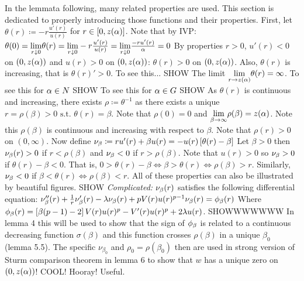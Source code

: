 \begin{outlines}
  \1 In the lemmata following, many related properties are used. This section is dedicated to properly introducing those functions and their properties.
  \1 First, let $\theta(r)\coloneqq-r\frac{u'(r)}{u(r)}$ for $r\in[0,z(\alpha)]$.
    \2 Note that by IVP: $\theta(0)=\underset{r\downarrow0}{\lim}\theta(r)=\underset{r\downarrow0}{\lim}-r\frac{u'(r)}{u(r)}=\underset{r\downarrow0}{\lim}\frac{-ru'(r)}{\alpha}=0$
    \2 By properties $r>0$, $u'(r)<0$ on $(0,z(\alpha))$ and $u(r)>0$ on $(0,z(\alpha))$: $\theta(r)>0$ on $(0,z(\alpha))$.
    \2 Also, $\theta(r)$ is increasing, that is $\theta(r)'>0$.
      \3 To see this... SHOW
    \2 The limit $\underset{r\to z(\alpha)}{\lim}\theta(r)=\infty$.
      \3 To see this for $\alpha\in N$ SHOW
      \3 To see this for $\alpha\in G$ SHOW
  \1 As $\theta(r)$ is continuous and increasing, there exists $\rho\coloneqq\theta^{-1}$ as there exists a unique $r=\rho(\beta)>0\text{ s.t. } \theta(r)=\beta$.
    \2 Note that $\rho(0)=0$ and $\underset{\beta\to\infty}{\lim}\rho(\beta)=z(\alpha)$.
    \2 Note this $\rho(\beta)$ is continuous and increasing with respect to $\beta$.
    \2 Note that $\rho(r)>0$ on $(0,\infty)$.
  \1 Now define $\nu_{\beta}\coloneqq ru'(r)+\beta u(r)=-u(r)\left[\theta(r)-\beta\right]$
  \1 Let $\beta>0$ then $\nu_{\beta}(r)>0$ if $r<\rho(\beta)$ and $\nu_{\beta}<0$ if $r>\rho(\beta)$.
    \2 Note that $u(r)>0$ so $\nu_{\beta}>0$ if $\theta(r)-\beta<0$. That is, $0>\theta(r)-\beta\iff\beta>\theta(r)\iff\rho(\beta)>r$. Similarly, $\nu_{\beta}<0$ if $\beta<\theta(r)\iff\rho(\beta)<r$.
  \1 All of these properties can also be illustrated by beautiful figures. SHOW
  \1 \emph{Complicated:} $\nu_{\beta}(r)$ satisfies the following differential equation:
    \2 $\nu_{\beta}''(r)+\frac{1}{r}\nu_{\beta}'(r)-\lambda\nu_{\beta}(r)+pV(r)u(r)^{p-1}\nu_{\beta}(r)=\phi_{\beta}(r)$
    \2 Where $\phi_{\beta}(r)=\left[\beta(p-1)-2\right]V(r)u(r)^p-V'(r)u(r)^p+2\lambda u(r)$.
    \2 SHOWWWWWWW
  \1 In lemma 4 this will be used to show that the sign of $\phi_{\beta}$ is related to a continuous decreasing function $\sigma(\beta)$ and this function crosses $\rho(\beta)$ in a unique $\beta_0$ (lemma 5.5). The specific $\nu_{\beta_0}$ and $\rho_0=\rho(\beta_0)$ then are used in strong version of Sturm comparison theorem in lemma 6 to show that $w$ has a unique zero on $(0,z(\alpha))$! COOL! Hooray! Useful.
\end{outlines}
